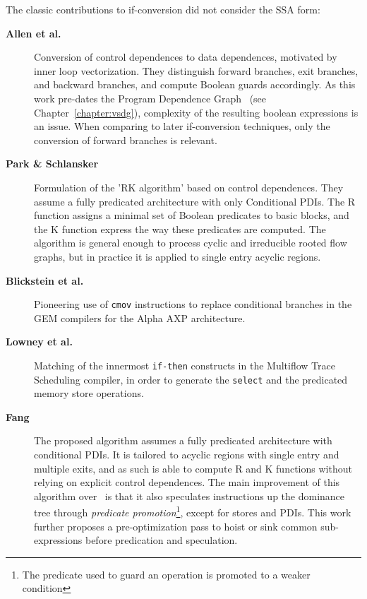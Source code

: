 \medskip
The classic contributions to if-conversion
did not consider the SSA form: \begin{description}

\item[\textbf{Allen et al.~\cite{Allen:1983:POPL}}] Conversion of control
dependences to data dependences, motivated by inner loop vectorization. They
distinguish forward branches, exit branches, and backward branches, and compute
Boolean guards accordingly. As this work pre-dates the Program Dependence Graph~\cite{Ferrante:1987:TOPLAS} (see Chapter~\ref{chapter:vsdg}), complexity of the resulting boolean expressions is
an issue. When comparing to later if-conversion techniques, only the conversion
of forward branches is relevant.

\item[\textbf{Park \& Schlansker~\cite{Park:1991:TR58}}] Formulation of the 'RK
algorithm' based on control dependences. They assume a fully predicated
architecture with only Conditional PDIs. The R function assigns a minimal set of
Boolean predicates to basic blocks, and the K function express the way these
predicates are computed.  The algorithm is general enough to process cyclic and
irreducible rooted flow graphs, but in practice it is applied to single entry
acyclic regions.

\item[\textbf{Blickstein et al.~\cite{Blickstein:1992:DTJ}}] Pioneering use of \texttt{cmov}
instructions to replace conditional branches in the GEM compilers for the Alpha
AXP architecture.

\item[\textbf{Lowney et al.~\cite{Lowney:1993:JS}}] Matching of the innermost \texttt{if-then}
constructs in the Multiflow Trace Scheduling compiler, in order to generate the
\texttt{select} and the predicated memory store operations.

\item[\textbf{Fang~\cite{Fang:1996:LCPC}}] The proposed algorithm assumes a
fully predicated architecture with conditional PDIs. It is tailored to acyclic
regions with single entry and multiple exits, and as such is able to compute R
and K functions without relying on explicit control dependences.  The main
improvement of this algorithm over~\cite{Park:1991:TR58} is that it also
speculates instructions up the dominance tree through \emph{predicate
promotion}\footnote{The predicate used to guard an operation is promoted to a
weaker condition},
except for stores and PDIs. This work further proposes a pre-optimization pass
to hoist or sink common sub-expressions before predication and speculation.


\end{description}
